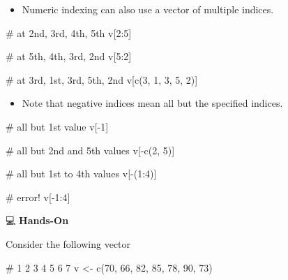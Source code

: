 \documentclass[
  letterpaper,
  DIV=11,
  numbers=noendperiod]{scrreprt}
\newenvironment{Shaded}{\begin{snugshade}}{\end{snugshade}}
\newcommand{\CommentTok}[1]{\textcolor[rgb]{0.37,0.37,0.37}{#1}}
\newcommand{\DecValTok}[1]{\textcolor[rgb]{0.68,0.00,0.00}{#1}}
\newcommand{\FunctionTok}[1]{\textcolor[rgb]{0.28,0.35,0.67}{#1}}
\newcommand{\NormalTok}[1]{\textcolor[rgb]{0.00,0.23,0.31}{#1}}
\newcommand{\OtherTok}[1]{\textcolor[rgb]{0.00,0.23,0.31}{#1}}
\newcommand{\SpecialCharTok}[1]{\textcolor[rgb]{0.37,0.37,0.37}{#1}}
\providecommand{\tightlist}{%
  \setlength{\itemsep}{0pt}\setlength{\parskip}{0pt}}\usepackage{longtable,booktabs,array}
\begin{document}
\begin{itemize}
\tightlist
\item
  Numeric indexing can also use a vector of multiple indices.
\end{itemize}

\begin{Shaded}
\begin{Highlighting}[]
\CommentTok{\# at 2nd, 3rd, 4th, 5th}
\NormalTok{v[}\DecValTok{2}\SpecialCharTok{:}\DecValTok{5}\NormalTok{]                 }

\CommentTok{\# at 5th, 4th, 3rd, 2nd}
\NormalTok{v[}\DecValTok{5}\SpecialCharTok{:}\DecValTok{2}\NormalTok{]                 }

\CommentTok{\# at 3rd, 1st, 3rd, 5th, 2nd}
\NormalTok{v[}\FunctionTok{c}\NormalTok{(}\DecValTok{3}\NormalTok{, }\DecValTok{1}\NormalTok{, }\DecValTok{3}\NormalTok{, }\DecValTok{5}\NormalTok{, }\DecValTok{2}\NormalTok{)]    }
\end{Highlighting}
\end{Shaded}

\begin{itemize}
\tightlist
\item
  Note that negative indices mean all but the specified indices.
\end{itemize}

\begin{Shaded}
\begin{Highlighting}[]
\CommentTok{\# all but 1st value}
\NormalTok{v[}\SpecialCharTok{{-}}\DecValTok{1}\NormalTok{]                    }

\CommentTok{\# all but 2nd and 5th values}
\NormalTok{v[}\SpecialCharTok{{-}}\FunctionTok{c}\NormalTok{(}\DecValTok{2}\NormalTok{, }\DecValTok{5}\NormalTok{)]              }

\CommentTok{\# all but 1st to 4th values}
\NormalTok{v[}\SpecialCharTok{{-}}\NormalTok{(}\DecValTok{1}\SpecialCharTok{:}\DecValTok{4}\NormalTok{)]                }

\CommentTok{\# error!}
\NormalTok{v[}\SpecialCharTok{{-}}\DecValTok{1}\SpecialCharTok{:}\DecValTok{4}\NormalTok{]                  }
\end{Highlighting}
\end{Shaded}

💻 \textbf{Hands-On}

Consider the following vector

\begin{Shaded}
\begin{Highlighting}[]
\CommentTok{\#       1   2   3   4   5   6   7}
\NormalTok{v }\OtherTok{\textless{}{-}} \FunctionTok{c}\NormalTok{(}\DecValTok{70}\NormalTok{, }\DecValTok{66}\NormalTok{, }\DecValTok{82}\NormalTok{, }\DecValTok{85}\NormalTok{, }\DecValTok{78}\NormalTok{, }\DecValTok{90}\NormalTok{, }\DecValTok{73}\NormalTok{)}
\end{Highlighting}
\end{Shaded}
\end{document}
